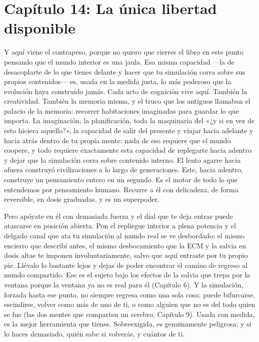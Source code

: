 \documentclass[11pt, twoside, openright]{book}
\begin{document}
\chapter*{Capítulo 14: La única libertad disponible}

Y aquí viene el contrapeso, porque no quiero que cierres el libro en este punto pensando que el mundo interior es una jaula. Esa misma capacidad ---la de desacoplarte de lo que tienes delante y hacer que tu simulación corra sobre sus propios contenidos--- es, usada en la medida justa, lo más poderoso que la evolución haya construido jamás. Cada acto de cognición vive aquí. También la creatividad. También la memoria misma, y el truco que los antiguos llamaban el palacio de la memoria: recorrer habitaciones imaginadas para guardar lo que importa. La imaginación, la planificación, toda la maquinaria del «¿y si en vez de esto hiciera aquello?», la capacidad de salir del presente y viajar hacia adelante y hacia atrás dentro de tu propia mente: nada de eso requiere que el mundo coopere, y todo requiere exactamente esta capacidad de replegarte hacia adentro y dejar que la simulación corra sobre contenido interno. El lento agarre hacia afuera construyó civilizaciones a lo largo de generaciones. Este, hacia adentro, construye un pensamiento entero en un segundo. Es el motor de todo lo que entendemos por pensamiento humano. Recurre a él con delicadeza, de forma reversible, en dosis graduadas, y es un superpoder.

Pero apóyate en él con demasiada fuerza y el dial que te deja entrar puede atascarse en posición abierta. Pon el repliegue interior a plena potencia y el delgado canal que ata tu simulación al mundo real se ve desbordado: el mismo encierro que describí antes, el mismo desbocamiento que la ECM y la salvia en dosis altas te imponen involuntariamente, salvo que aquí entraste por tu propio pie. Llévalo lo bastante lejos y dejas de poder encontrar el camino de regreso al mundo compartido. Ese es el sujeto bajo los efectos de la salvia que trepa por la ventana porque la ventana ya no es real para él (Capítulo 6). Y la simulación, forzada hasta ese punto, no siempre regresa como una sola cosa: puede bifurcarse, escindirse, volver como más de uno de ti, o como alguien que no es del todo quien se fue (las dos mentes que comparten un cerebro, Capítulo 9). Usada con medida, es la mejor herramienta que tienes. Sobreexigida, es genuinamente peligrosa; y si lo haces demasiado, quién sabe si volverás, y cuántos de ti.
\end{document}
